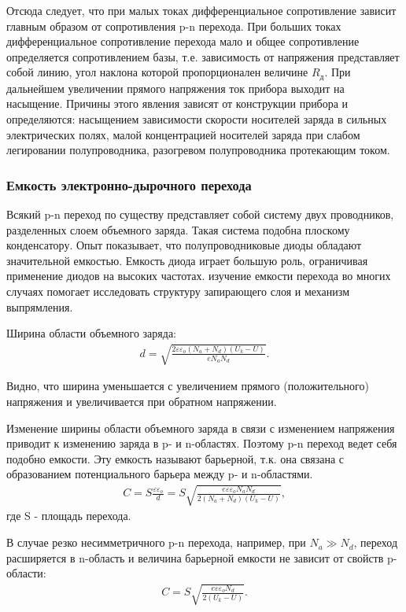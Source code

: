 Отсюда следует, что при малых токах дифференциальное сопротивление зависит главным образом от сопротивления p-n перехода. При больших токах дифференциальное сопротивление перехода мало и общее сопротивление определяется сопротивлением базы, т.е. зависимость от напряжения представляет собой линию, угол наклона которой пропорционален величине $R_{\text{д}}$. При дальнейшем увеличении прямого напряжения ток прибора выходит на насыщение. Причины этого явления зависят от конструкции прибора и определяются: насыщением зависимости скорости носителей заряда в сильных электрических полях, малой концентрацией носителей заряда при слабом легировании полупроводника, разогревом полупроводника протекающим током.

\subsubsection{Емкость электронно-дырочного перехода}
Всякий p-n переход по существу представляет собой систему двух проводников, разделенных слоем объемного заряда. Такая система подобна плоскому конденсатору. Опыт показывает, что полупроводниковые диоды обладают значительной емкостью. Емкость диода играет большую роль, ограничивая применение диодов на высоких частотах. изучение емкости перехода во многих случаях помогает исследовать структуру запирающего слоя и механизм выпрямления.

Ширина области объемного заряда:
\begin{gather}
	d=\sqrt{\frac{2\varepsilon \varepsilon_o(N_a+N_d)(U_k-U)}{eN_aN_d}}.
\end{gather} 

Видно, что ширина уменьшается с увеличением прямого (положительного) напряжения и увеличивается при обратном напряжении.

Изменение ширины области объемного заряда в связи с изменением напряжения приводит к изменению заряда в p- и n-областях. Поэтому p-n переход ведет себя подобно емкости. Эту емкость называют барьерной, т.к. она связана с образованием потенциального барьера между p- и n-областями. 
\begin{gather}
	C=S\frac{\varepsilon \varepsilon_o}{d}=S\sqrt{\frac{e\varepsilon \varepsilon_oN_aN_d}{2(N_a+N_d)(U_k-U)}},
\end{gather}
где S - площадь перехода.

В случае резко несимметричного p-n перехода, например, при $N_a \gg N_d$, переход расширяется в n-область и величина барьерной емкости не зависит от свойств p-области:
\begin{gather}
	C=S\sqrt{\frac{e\varepsilon \varepsilon_oN_d}{2(U_k-U)}}.
\end{gather}

